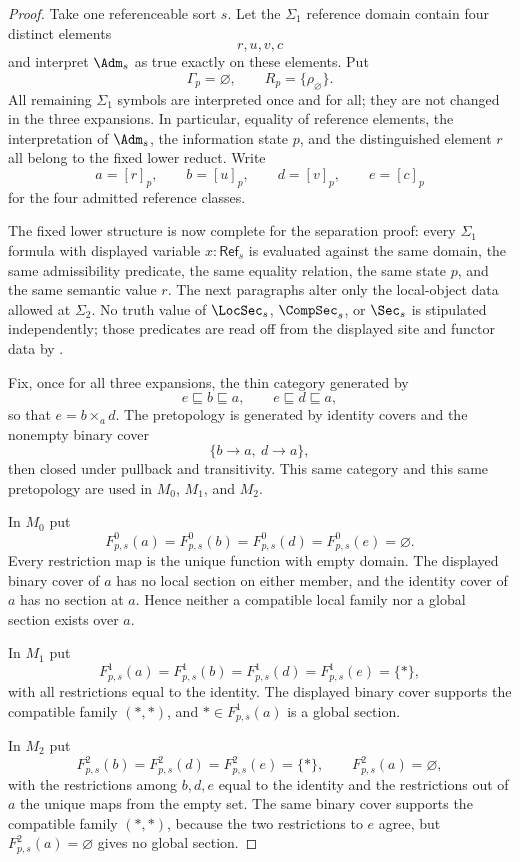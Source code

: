 \begin{proof}
Take one referenceable sort $s$. Let the $\Sigma_1$ reference domain contain four distinct elements
\[
r,u,v,c
\]
and interpret $\Adm_s$ as true exactly on these elements. Put
\[
\Gamma_p=\varnothing,
\qquad
R_p=\{\rho_\varnothing\}.
\]
All remaining $\Sigma_1$ symbols are interpreted once and for all; they are not changed in the three expansions. In particular, equality of reference elements, the interpretation of $\Adm_s$, the information state $p$, and the distinguished element $r$ all belong to the fixed lower reduct. Write
\[
a=[r]_p,\qquad b=[u]_p,\qquad d=[v]_p,\qquad e=[c]_p
\]
for the four admitted reference classes.

The fixed lower structure is now complete for the separation proof: every $\Sigma_1$ formula with displayed variable $x:\mathsf{Ref}_s$ is evaluated against the same domain, the same admissibility predicate, the same equality relation, the same state $p$, and the same semantic value $r$. The next paragraphs alter only the local-object data allowed at $\Sigma_2$.
No truth value of $\LocSec_s$, $\CompSec_s$, or $\Sec_s$ is stipulated independently; those predicates are read off from the displayed site and functor data by .

Fix, once for all three expansions, the thin category generated by
\[
e\sqsubseteq b\sqsubseteq a,
\qquad
e\sqsubseteq d\sqsubseteq a,
\]
so that $e=b\times_a d$. The pretopology is generated by identity covers and the nonempty binary cover
\[
\{b\to a,\ d\to a\},
\]
then closed under pullback and transitivity. This same category and this same pretopology are used in $M_0$, $M_1$, and $M_2$.

In $M_0$ put
\[
F^0_{p,s}(a)=F^0_{p,s}(b)=F^0_{p,s}(d)=F^0_{p,s}(e)=\varnothing.
\]
Every restriction map is the unique function with empty domain. The displayed binary cover of $a$ has no local section on either member, and the identity cover of $a$ has no section at $a$. Hence neither a compatible local family nor a global section exists over $a$.

In $M_1$ put
\[
F^1_{p,s}(a)=F^1_{p,s}(b)=F^1_{p,s}(d)=F^1_{p,s}(e)=\{*\},
\]
with all restrictions equal to the identity. The displayed binary cover supports the compatible family $(*,*)$, and $*\in F^1_{p,s}(a)$ is a global section.

In $M_2$ put
\[
F^2_{p,s}(b)=F^2_{p,s}(d)=F^2_{p,s}(e)=\{*\},
\qquad
F^2_{p,s}(a)=\varnothing,
\]
with the restrictions among $b,d,e$ equal to the identity and the restrictions out of $a$ the unique maps from the empty set. The same binary cover supports the compatible family $(*,*)$, because the two restrictions to $e$ agree, but $F^2_{p,s}(a)=\varnothing$ gives no global section.


\end{proof}
